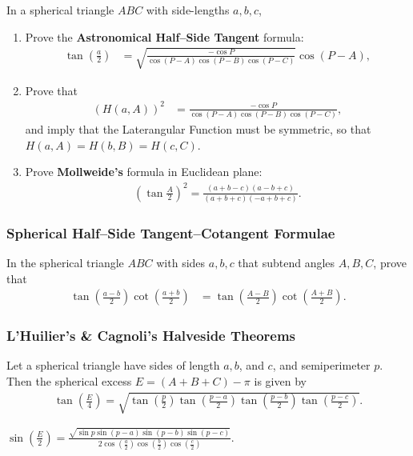 \documentclass[12pt,a4paper]{memoir}
\theoremstyle{definition}
\begin{document}
	\begin{question}
		In a spherical triangle $ABC$ with side-lengths $a,b,c$,
		\begin{enumerate}
			\item  Prove the \textbf{Astronomical Half--Side Tangent} formula:
			\begin{align*}
				\tan \left({\frac {a}{2}}\right)&={\sqrt {\frac {-\cos P}{\cos(P-A)\cos(P-B)\cos(P-C)}}}\cos(P-A),
			\end{align*}
			\item Prove that
			\begin{align*}
				\left(H(a,A)\right)^2 &= \frac {-\cos P}{\cos(P-A)\cos(P-B)\cos(P-C)},
			\end{align*}
			and imply that the Laterangular Function must be symmetric, so that $H(a,A) = H(b,B) = H(c,C)$.
			\item Prove \textbf{Mollweide's} formula in Euclidean plane:
			\begin{align*}
				\displaystyle \left(\tan \frac{A}{2}\right )^{2}=\frac {(a+b-c)(a-b+c)}{(a+b+c)(-a+b+c)}.
			\end{align*}
		\end{enumerate}
	\end{question}

\subsubsection{Spherical Half--Side Tangent--Cotangent Formulae}

	\begin{question}
		In the spherical triangle $ABC$ with sides $a,b,c$ that subtend angles $A,B,C$, prove that
		\begin{align*}
			\tan \left(\frac{a-b}{2}\right) \cot \left(\frac{a+b}{2}\right) &=\tan \left(\frac{A-B}{2}\right) \cot \left(\frac{A+B}{2}\right).
		\end{align*}
	\end{question}   
	
\subsubsection{L'Huilier's \& Cagnoli's Halveside Theorems}
		\begin{question}[name={L'Huilier's Theorem}]
			Let a spherical triangle have sides of length $a, b$, and $c$, and semiperimeter $p$. Then the spherical excess $E=(A+B+C)-\pi$ is given by
			\begin{align*}
				\tan\left(\frac{E}{4}\right)=\sqrt{\tan\left(\frac{p}{2}\right)\tan\left(\frac{p-a}{2}\right)\tan\left(\frac{p-b}{2}\right)\tan\left(\frac{p-c}{2}\right)}. 
			\end{align*}
		\end{question}
		\begin{question}[name={Cagnoli's Theorem}]
			$\displaystyle \sin\left(\frac{E}{2}\right)=\frac{\sqrt{\sin p \sin(p-a)\sin(p-b)\sin(p-c)}}{\displaystyle 2\cos\left(\frac{a}{2}\right)\cos\left(\frac{b}{2}\right)\cos\left(\frac{c}{2}\right)}$.
		\end{question}
\end{document}
